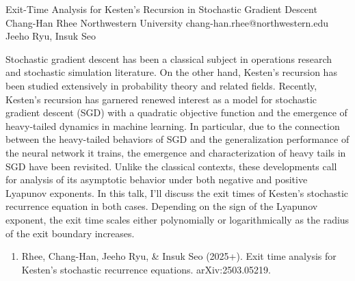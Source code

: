 \begin{talk}
  {Exit-Time Analysis for Kesten's Recursion in Stochastic Gradient Descent}%
  {Chang-Han Rhee}%
  {Northwestern University}%
  {chang-han.rhee@northwestern.edu}%
  {Jeeho Ryu, Insuk Seo}%
  
    


Stochastic gradient descent has been a classical subject in operations research and stochastic simulation literature.
On the other hand, Kesten's recursion has been studied extensively in probability theory and related fields. 
Recently, Kesten's recursion has garnered renewed interest as a model for stochastic
gradient descent (SGD) with a quadratic objective function and the emergence of heavy-tailed dynamics in machine learning. 
In particular, due to the connection between the heavy-tailed behaviors of SGD and the generalization performance of the neural network it trains, the emergence and characterization of heavy tails in SGD have been revisited. 
Unlike the classical contexts, these developments call for analysis of its asymptotic behavior under both negative and positive Lyapunov exponents. In this talk, I'll discuss the exit times of Kesten's stochastic recurrence equation in both cases. Depending on the sign of the Lyapunov exponent, the exit time scales either polynomially or logarithmically as the radius of the exit boundary increases.

\medskip

\begin{enumerate}
 \item[{[1]}] 
    Rhee, Chang-Han, Jeeho Ryu, \& Insuk Seo (2025+). Exit time analysis for Kesten's stochastic recurrence equations. arXiv:2503.05219.
    

\end{enumerate}

\end{talk}

